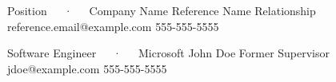 
\begin{cventries}

   \cventry
   {Position~~~·~~~Company Name} %
   {Reference Name} %
   {Relationship} %
   {reference.email@example.com} %
   {555-555-5555} %

   \cventry
   {Software Engineer~~~·~~~Microsoft} %
   {John Doe} %
   {Former Supervisor} %
   {jdoe@example.com} %
   {555-555-5555} %


\end{cventries}
